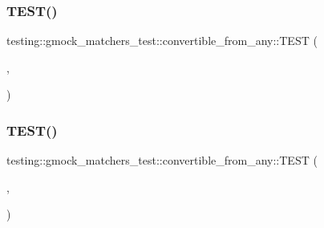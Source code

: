 \subsubsection{\texorpdfstring{TEST()}{TEST()}\hspace{0.1cm}{\footnotesize\ttfamily [3/4]}}
{\footnotesize\ttfamily testing\+::gmock\+\_\+matchers\+\_\+test\+::convertible\+\_\+from\+\_\+any\+::\+T\+E\+ST (\begin{DoxyParamCaption}\item[{Safe\+Matcher\+Cast\+Test}]{,  }\item[{Conversion\+Constructor\+Is\+Used}]{ }\end{DoxyParamCaption})}

\mbox{\label{namespacetesting_1_1gmock__matchers__test_1_1convertible__from__any_a97a2ef4bbe1a2702e4bf79c12b1b9e9a}} 
\subsubsection{\texorpdfstring{TEST()}{TEST()}\hspace{0.1cm}{\footnotesize\ttfamily [4/4]}}
{\footnotesize\ttfamily testing\+::gmock\+\_\+matchers\+\_\+test\+::convertible\+\_\+from\+\_\+any\+::\+T\+E\+ST (\begin{DoxyParamCaption}\item[{Safe\+Matcher\+Cast\+Test}]{,  }\item[{From\+Convertible\+From\+Any}]{ }\end{DoxyParamCaption})}

